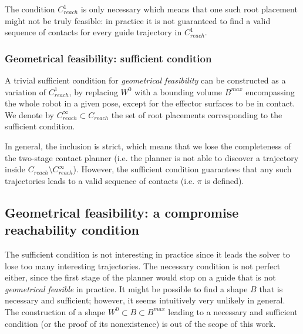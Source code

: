 The condition $C_{reach}^1$ is only necessary which means that one such root placement might not be truly feasible: in practice it is not guaranteed to find a valid sequence of contacts for every guide trajectory in $C_{reach}^1$.

\subsubsection*{Geometrical feasibility: sufficient condition}
A trivial sufficient condition for \textit{geometrical feasibility} can be constructed as a variation of $C_{reach}^1$, by replacing $W^0$ with a bounding volume $B^{max}$ encompassing the whole robot in a given pose, except for the effector surfaces to be in contact. We denote by \mbox{$C_{reach}^\infty \subset C_{reach}$} the set of root placements corresponding to the sufficient condition.

In general, the inclusion is strict, which means that we lose the completeness of the two-stage contact planner (i.e. the planner is not able to discover a trajectory inside \mbox{$C_{reach} \setminus C_{reach}^\infty$}). However, the sufficient condition guarantees that any such trajectories leads to a valid sequence of contacts (i.e. $\pi$ is defined).

\subsection{Geometrical feasibility: a compromise reachability condition}
The sufficient condition is not interesting in practice since it leads the solver to lose too many interesting trajectories. The necessary condition is not perfect either, since the first stage of the planner would stop on a guide that is not \textit{geometrical feasible} in practice. It might be possible to find a shape $B$ that is necessary and sufficient; however, it seems intuitively very unlikely in general. The construction of a shape $W^0 \subset B \subset B^{max}$ leading to a necessary and sufficient condition (or the proof of its nonexistence) is out of the scope of this work.

